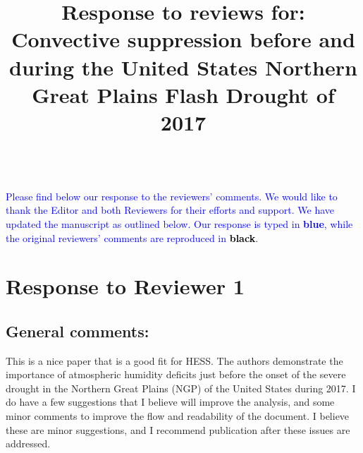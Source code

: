 \documentclass[hess, manuscript]{copernicus}
\def\TG{\textcolor{blue}}
\begin{document}
\title{Response to reviews for: Convective suppression before and during the United States Northern Great Plains Flash Drought of 2017}













\received{}
\pubdiscuss{} %
\revised{}
\accepted{}
\published{}




\maketitle

\TG{\\ Please find below our response to the reviewers' comments. We would like to thank the Editor and both Reviewers for their efforts and support. We have updated the manuscript as outlined below. Our response is typed in {\bf blue}, while the original reviewers' comments are reproduced in \textcolor{black}{\bf black}}. 

\section{Response to Reviewer 1}

\subsection{General comments:}
This is a nice paper that is a good fit for HESS. The authors demonstrate the importance of atmospheric humidity deficits just before the onset of the severe drought in the Northern Great Plains (NGP) of the United States during 2017.  I do have a few suggestions that I believe will improve the analysis, and some minor comments to improve the flow and readability of the document. I believe these are minor suggestions, and I recommend publication after these issues are addressed. 
\end{document}
